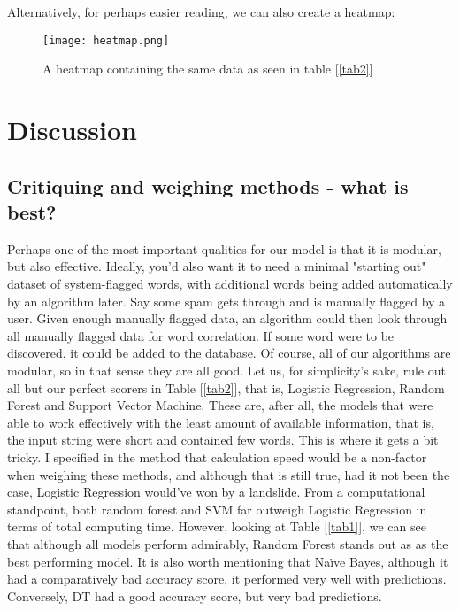 \documentclass{article}
\begin{document}
Alternatively, for perhaps easier reading, we can also create a heatmap:
\begin{figure}[ht!]
    \centering
    \texttt{[image: heatmap.png]}
    \caption{A heatmap containing the same data as seen in table [\ref{tab2}]}
    \label{fig2}
\end{figure}
\newpage
\section{Discussion}
\subsection*{Critiquing and weighing methods - what is best?}
Perhaps one of the most important qualities for our model is that it is modular, but also effective. Ideally, you'd also want it to need a minimal "starting out" dataset of system-flagged words, with additional words being added automatically by an algorithm later. Say some spam gets through and is manually flagged by a user. Given enough manually flagged data, an algorithm could then look through all manually flagged data for word correlation. If some word were to be discovered, it could be added to the database. \newline
Of course, all of our algorithms are modular, so in that sense they are all good. \newline
Let us, for simplicity's sake, rule out all but our perfect scorers in Table [\ref{tab2}], that is, Logistic Regression, Random Forest and Support Vector Machine. These are, after all, the models that were able to work effectively with the least amount of available information, that is, the input string were short and contained few words. \newline
This is where it gets a bit tricky. I specified in the method that calculation speed would be a non-factor when weighing these methods, and although that is still true, had it not been the case, Logistic Regression would've won by a landslide. From a computational standpoint, both random forest and SVM far outweigh Logistic Regression in terms of total computing time. However, looking at Table [\ref{tab1}], we can see that although all models perform admirably, Random Forest stands out as as the best performing model. \newline
It is also worth mentioning that Naïve Bayes, although it had a comparatively bad accuracy score, it performed very well with predictions. Conversely, DT had a good accuracy score, but very bad predictions. \newline
\end{document}
